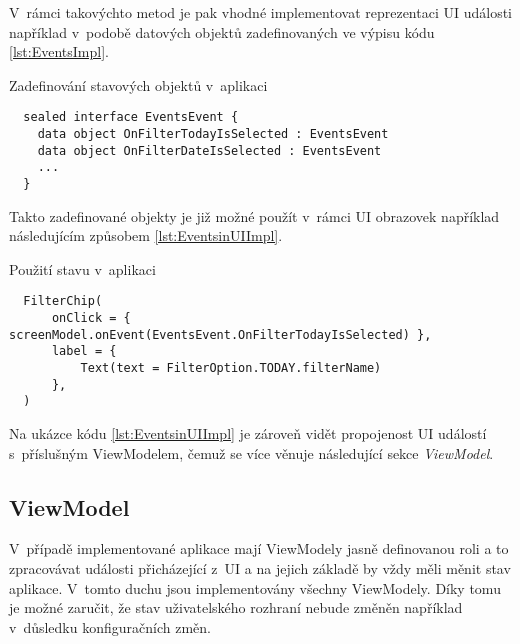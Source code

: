 V~rámci takovýchto metod je pak vhodné implementovat reprezentaci UI události například v~podobě datových objektů 
zadefinovaných ve výpisu kódu \ref{lst:EventsImpl}.

\begin{listing}[H]
\caption{Zadefinování stavových objektů v~aplikaci}\label{lst:EventsImpl}
\begin{verbatim}
  sealed interface EventsEvent {
    data object OnFilterTodayIsSelected : EventsEvent
    data object OnFilterDateIsSelected : EventsEvent
    ...
  }
\end{verbatim}
\end{listing}

Takto zadefinované objekty je již možné použít v~rámci UI obrazovek například následujícím způsobem \ref{lst:EventsinUIImpl}.

\begin{listing}[H]
\caption{Použití stavu v~aplikaci}\label{lst:EventsinUIImpl}
\begin{verbatim}
  FilterChip(
      onClick = { screenModel.onEvent(EventsEvent.OnFilterTodayIsSelected) },
      label = {
          Text(text = FilterOption.TODAY.filterName)
      },
  )
\end{verbatim}
\end{listing}

Na ukázce kódu \ref{lst:EventsinUIImpl} je zároveň vidět propojenost UI událostí s~příslušným ViewModelem, čemuž se více věnuje následující
sekce \textit{ViewModel}.






\subsection{ViewModel} \label{ViewModelImpl}

V~případě implementované aplikace mají ViewModely jasně definovanou roli a to zpracovávat události přicházející z~UI a na jejich základě 
by vždy měli měnit stav aplikace. \cite{viewmodelEvents} V~tomto duchu jsou implementovány všechny ViewModely. Díky tomu je možné 
zaručit, že stav uživatelského rozhraní nebude změněn například v~důsledku konfiguračních změn. 

